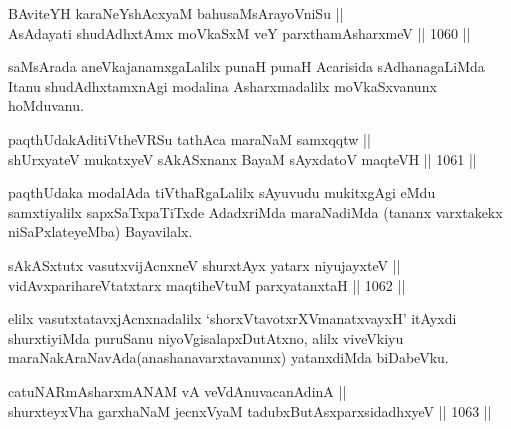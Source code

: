 
\begin{shl}
BAviteYH karaNeYshAcxyaM bahusaMsArayoVniSu || \\
AsAdayati shudAdhxtAmx moVkaSxM veY parxthamAsharxmeV ||  1060 ||  
\end{shl}

\begin{artha}
saMsArada aneVkajanamxgaLalilx punaH punaH Acarisida sAdhanagaLiMda Itanu shudAdhxtamxnAgi modalina Asharxmadalilx moVkaSxvanunx hoMduvanu.
\end{artha}


\begin{shl}
paqthUdakAditiVtheVRSu tathAca maraNaM samxqqtw || \\
shUrxyateV mukatxyeV sAkASxnanx BayaM sAyxdatoV maqteVH ||  1061 ||  
\end{shl}

\begin{artha}
paqthUdaka modalAda tiVthaRgaLalilx sAyuvudu mukitxgAgi eMdu samxtiyalilx sapxSaTxpaTiTxde AdadxriMda maraNadiMda (tananx varxtakekx niSaPxlateyeMba) Bayavilalx.
\end{artha}

\begin{shl}
sAkASxtutx vasutxvijAcnxneV shurxtAyx yatarx niyujayxteV || \\
vidAvxparihareVtatxtarx maqtiheVtuM parxyatanxtaH ||  1062 ||  
\end{shl}

\begin{artha}
elilx vasutxtatavxjAcnxnadalilx `shorxVtavotxrXVmanatxvayxH' itAyxdi shurxtiyiMda puruSanu niyoVgisalapxDutAtxno, alilx viveVkiyu maraNakAraNavAda(anashanavarxtavanunx) yatanxdiMda biDabeVku.
\end{artha}


\begin{shl}
\footnotemark[1]catuNARmAsharxmANAM vA veVdAnuvacanAdinA || \\
shurxteyxVha garxhaNaM jecnxVyaM tadubxButAsxparxsidadhxyeV ||  1063 ||  
\end{shl}

